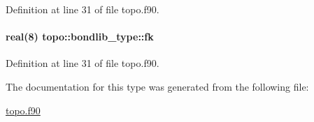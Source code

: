 Definition at line 31 of file topo.\-f90.

\hypertarget{structtopo_1_1bondlib__type_ae7ba2d46169647c37374c277c8c8cdc0}{
\paragraph[{fk}]{\setlength{\rightskip}{0pt plus 5cm}real(8) topo\-::bondlib\-\_\-type\-::fk}}\label{structtopo_1_1bondlib__type_ae7ba2d46169647c37374c277c8c8cdc0}


Definition at line 31 of file topo.\-f90.



The documentation for this type was generated from the following file\-:\begin{DoxyCompactItemize}
\item 
\hyperlink{topo_8f90}{topo.\-f90}\end{DoxyCompactItemize}

